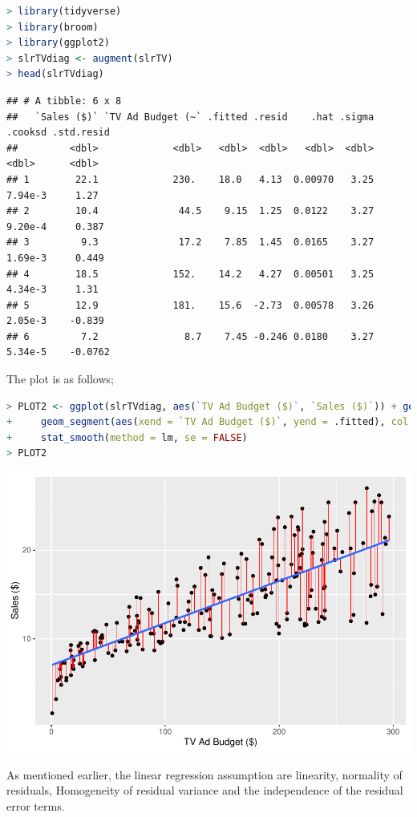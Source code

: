 \documentclass[
]{article}
\begin{document}
\begin{lstlisting}[language=R]
> library(tidyverse)
> library(broom)
> library(ggplot2)
> slrTVdiag <- augment(slrTV)
> head(slrTVdiag)
\end{lstlisting}

\begin{lstlisting}
## # A tibble: 6 x 8
##   `Sales ($)` `TV Ad Budget (~` .fitted .resid    .hat .sigma .cooksd .std.resid
##         <dbl>             <dbl>   <dbl>  <dbl>   <dbl>  <dbl>   <dbl>      <dbl>
## 1        22.1             230.    18.0   4.13  0.00970   3.25 7.94e-3     1.27  
## 2        10.4              44.5    9.15  1.25  0.0122    3.27 9.20e-4     0.387 
## 3         9.3              17.2    7.85  1.45  0.0165    3.27 1.69e-3     0.449 
## 4        18.5             152.    14.2   4.27  0.00501   3.25 4.34e-3     1.31  
## 5        12.9             181.    15.6  -2.73  0.00578   3.26 2.05e-3    -0.839 
## 6         7.2               8.7    7.45 -0.246 0.0180    3.27 5.34e-5    -0.0762
\end{lstlisting}

The plot is as follows;

\begin{lstlisting}[language=R]
> PLOT2 <- ggplot(slrTVdiag, aes(`TV Ad Budget ($)`, `Sales ($)`)) + geom_point() +
+     geom_segment(aes(xend = `TV Ad Budget ($)`, yend = .fitted), col = "red", size = 0.3) +
+     stat_smooth(method = lm, se = FALSE)
> PLOT2
\end{lstlisting}

\includegraphics{Types-of-Regressions_files/figure-latex/unnamed-chunk-15-1.pdf}

As mentioned earlier, the linear regression assumption are linearity,
normality of residuals, Homogeneity of residual variance and the
independence of the residual error terms.
\end{document}
